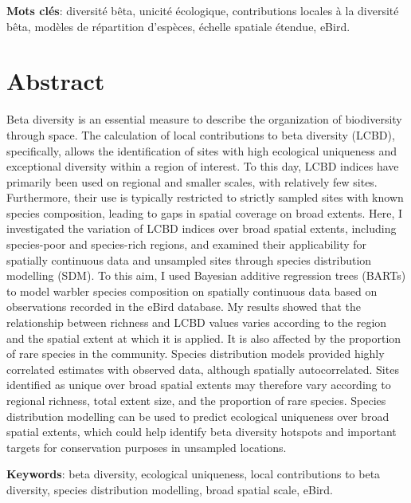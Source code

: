 \documentclass[12pt,twoside,maitrise]{dms}
\numberwithin{equation}{section}
\numberwithin{table}{chapter}
\numberwithin{figure}{chapter}
\begin{document}
\textbf{Mots clés}: diversité bêta, unicité écologique, contributions locales à la diversité bêta, modèles de répartition d'espèces, échelle spatiale étendue, eBird.


\anglais
\chapter*{Abstract}

Beta diversity is an essential measure to describe the organization of biodiversity through space. The calculation of local contributions to beta diversity (LCBD), specifically, allows the identification of sites with high ecological uniqueness and exceptional diversity within a region of interest. To this day, LCBD indices have primarily been used on regional and smaller scales, with relatively few sites. Furthermore, their use is typically restricted to strictly sampled sites with known species composition, leading to gaps in spatial coverage on broad extents. Here, I investigated the variation of LCBD indices over broad spatial extents, including species-poor and species-rich regions, and examined their applicability for spatially continuous data and unsampled sites through species distribution modelling (SDM). To this aim, I used Bayesian additive regression trees (BARTs) to model warbler species composition on spatially continuous data based on observations recorded in the eBird database. My results showed that the relationship between richness and LCBD values varies according to the region and the spatial extent at which it is applied. It is also affected by the proportion of rare species in the community. Species distribution models provided highly correlated estimates with observed data, although spatially autocorrelated. Sites identified as unique over broad spatial extents may therefore vary according to regional richness, total extent size, and the proportion of rare species. Species distribution modelling can be used to predict ecological uniqueness over broad spatial extents, which could help identify beta diversity hotspots and important targets for conservation purposes in unsampled locations.

\textbf{Keywords}: beta diversity, ecological uniqueness, local contributions to beta diversity, species distribution modelling, broad spatial scale, eBird.
\end{document}

